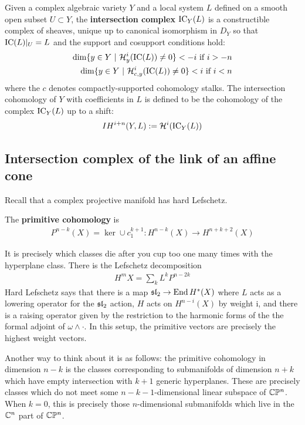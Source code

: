 \documentclass[12pt]{article}
\begin{document}
\begin{definition}
    Given a complex algebraic variety $Y$ and a local system $L$ defined
    on a smooth open subset $U\subset Y$, the \textbf{intersection complex}
    $\operatorname{IC}_Y(L)$ is a constructible complex of sheaves, unique up to
    canonical isomorphism in $D_Y$ so that $\operatorname{IC}(L)\vert_U = L$ and the
    support and cosupport conditions hold: \begin{align*}
        \dim\{y\in Y \ \vert \  {\mathcal{H}}^i_y(\operatorname{IC}(L)) \neq 0\} < - i \text{ if $i>-n$} \\
        \dim\{y\in Y \ \vert \  {\mathcal{H}}^i_{c,y}(\operatorname{IC}(L)) \neq 0\} < i \text{ if $i < n$}
    \end{align*} where the $c$ denotes compactly-supported cohomology stalks.
    The intersection cohomology of $Y$ with coefficients in $L$ is defined to be
    the cohomology of the complex $\operatorname{IC}_Y(L)$ up to a shift: \begin{align*}
        IH^{i+n}(Y,L) := {\mathcal{H}}^{i}(\operatorname{IC}_Y(L))
    \end{align*}
\end{definition}

\subsection{Intersection complex of the link of an affine cone}
Recall that a complex projective manifold has hard Lefschetz.

\begin{definition}
    The \textbf{primitive cohomology} is \begin{align*}
        P^{n-k}(X) = \ker \cup c_1^{k+1}: H^{n-k}(X) \to H^{n+k+2}(X)
    \end{align*}
\end{definition}
It is precisely which classes die after
you cup too one many times with the hyperplane class. There is the Lefschetz
decomposition \begin{align*}
    H^mX = \sum_k L^k P^{n-2k}
\end{align*} Hard Lefschetz says that there is a map $\mathfrak{sl}_2 \to \operatorname{End} H^*(X)$
where $L$ acts as a lowering operator for the $\mathfrak{sl}_2$ action, $H$ acts on $H^{n-i}(X)$
by weight i, and there is a raising operator given by
    the restriction to the harmonic forms of the the formal adjoint of $\omega \wedge \cdot$.
In this setup, the primitive vectors are precisely the highest weight vectors.

Another way to think about it is as follows: the primitive cohomology in dimension $n-k$
is the classes corresponding to submanifolds of dimension $n+k$ which have empty
intersection with $k+1$ generic hyperplanes. These are precisely classes which do not
meet some $n-k-1$-dimensional linear subspace of $\mathbb{C}\mathbb{P}^n$. When $k=0$, this is
precisely those $n$-dimensional submanifolds which live in the $\mathbb{C}^n$ part of $\mathbb{C}\mathbb{P}^n$.
\end{document}
